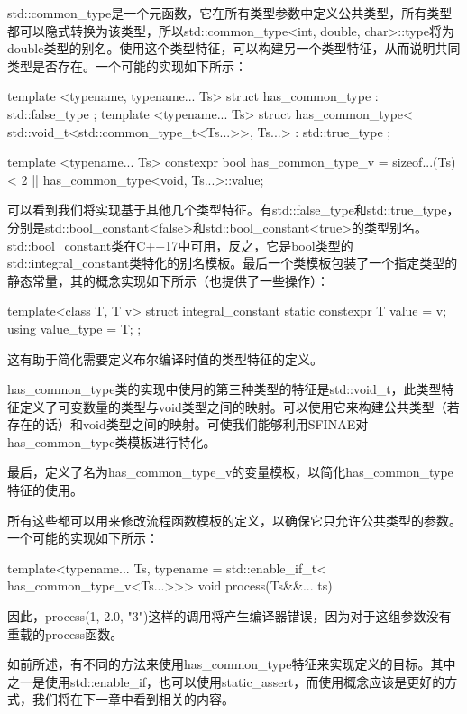 std::common_type是一个元函数，它在所有类型参数中定义公共类型，所有类型都可以隐式转换为该类型，所以std::common_type<int, double, char>::type将为double类型的别名。使用这个类型特征，可以构建另一个类型特征，从而说明共同类型是否存在。一个可能的实现如下所示：

\begin{cppcode}
template <typename, typename... Ts>
struct has_common_type : std::false_type {};
template <typename... Ts>
struct has_common_type<
		std::void_t<std::common_type_t<Ts...>>,
		Ts...>
	: std::true_type {};
	
template <typename... Ts>
constexpr bool has_common_type_v =
	sizeof...(Ts) < 2 ||
	has_common_type<void, Ts...>::value;
\end{cppcode}

可以看到我们将实现基于其他几个类型特征。有std::false_type和std::true_type，分别是std::bool_constant<false>和std::bool_constant<true>的类型别名。std::bool_constant类在C++17中可用，反之，它是bool类型的std::integral_constant类特化的别名模板。最后一个类模板包装了一个指定类型的静态常量，其的概念实现如下所示（也提供了一些操作）：

\begin{cppcode}
template<class T, T v>
struct integral_constant
{
	static constexpr T value = v;
	using value_type = T;
};
\end{cppcode}

这有助于简化需要定义布尔编译时值的类型特征的定义。

has_common_type类的实现中使用的第三种类型的特征是std::void_t，此类型特征定义了可变数量的类型与void类型之间的映射。可以使用它来构建公共类型（若存在的话）和void类型之间的映射。可使我们能够利用SFINAE对has_common_type类模板进行特化。

最后，定义了名为has_common_type_v的变量模板，以简化has_common_type特征的使用。

所有这些都可以用来修改流程函数模板的定义，以确保它只允许公共类型的参数。一个可能的实现如下所示：

\begin{cppcode}
template<typename... Ts,
		 typename = std::enable_if_t<
						has_common_type_v<Ts...>>>
void process(Ts&&... ts)
{ }
\end{cppcode}

因此，process(1, 2.0, "3")这样的调用将产生编译器错误，因为对于这组参数没有重载的process函数。

如前所述，有不同的方法来使用has_common_type特征来实现定义的目标。其中之一是使用std::enable_if，也可以使用static_assert，而使用概念应该是更好的方式，我们将在下一章中看到相关的内容。








